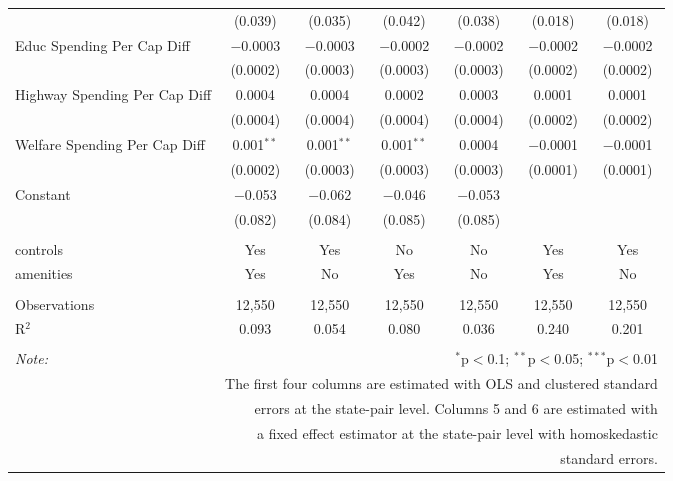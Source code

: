 \begin{table}[!htbp]
\begin{tabular}{@{\extracolsep{5pt}}lcccccc}
  & (0.039) & (0.035) & (0.042) & (0.038) & (0.018) & (0.018) \\ 
  Educ Spending Per Cap Diff & $-$0.0003 & $-$0.0003 & $-$0.0002 & $-$0.0002 & $-$0.0002 & $-$0.0002 \\ 
  & (0.0002) & (0.0003) & (0.0003) & (0.0003) & (0.0002) & (0.0002) \\ 
  Highway Spending Per Cap Diff & 0.0004 & 0.0004 & 0.0002 & 0.0003 & 0.0001 & 0.0001 \\ 
  & (0.0004) & (0.0004) & (0.0004) & (0.0004) & (0.0002) & (0.0002) \\ 
  Welfare Spending Per Cap Diff & 0.001$^{**}$ & 0.001$^{**}$ & 0.001$^{**}$ & 0.0004 & $-$0.0001 & $-$0.0001 \\ 
  & (0.0002) & (0.0003) & (0.0003) & (0.0003) & (0.0001) & (0.0001) \\ 
  Constant & $-$0.053 & $-$0.062 & $-$0.046 & $-$0.053 &  &  \\ 
  & (0.082) & (0.084) & (0.085) & (0.085) &  &  \\ 
 \hline \\[-1.8ex] 
controls & Yes & Yes & No & No & Yes & Yes \\ 
amenities & Yes & No & Yes & No & Yes & No \\ 
\hline \\[-1.8ex] 
Observations & 12,550 & 12,550 & 12,550 & 12,550 & 12,550 & 12,550 \\ 
R$^{2}$ & 0.093 & 0.054 & 0.080 & 0.036 & 0.240 & 0.201 \\ 
\hline 
\hline \\[-1.8ex] 
\textit{Note:}  & \multicolumn{6}{r}{$^{*}$p$<$0.1; $^{**}$p$<$0.05; $^{***}$p$<$0.01} \\ 
 & \multicolumn{6}{r}{The first four columns are estimated with OLS and clustered standard} \\ 
 & \multicolumn{6}{r}{ errors at the state-pair level. Columns 5 and 6 are estimated with} \\ 
 & \multicolumn{6}{r}{a fixed effect estimator at the state-pair level with homoskedastic} \\ 
 & \multicolumn{6}{r}{standard errors.} \\ 
\end{tabular} 
\end{table} 
